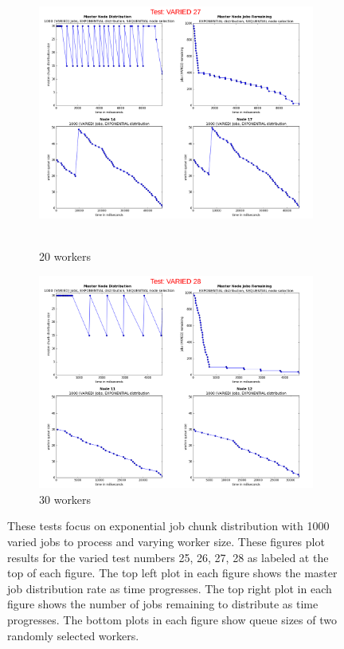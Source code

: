 \documentclass{article}
\begin{document}
\begin{figure}
  
  \begin{subfigure}[b]{0.5\linewidth}
    \centering
    \hbox{\hspace{-5.0em} \includegraphics[width=1.2\linewidth]{combined_varied_growing_workers_exp/case_varied_27} }
    \caption{20 workers} 
    \label{testExpVaried20} 
    \vspace{4ex}
  \end{subfigure}%
  \begin{subfigure}[b]{0.5\linewidth}
    \centering
    \includegraphics[width=1.2\linewidth]{combined_varied_growing_workers_exp/case_varied_28} 
    \caption{30 workers} 
    \label{testExpVaried30} 
    \vspace{4ex}
  \end{subfigure} 
  
  
  \caption{These tests focus on exponential job chunk distribution with 1000 varied jobs to process and varying worker size. These figures plot results for the varied test numbers 25, 26, 27, 28 as labeled at the top of each figure. The top left plot in each figure shows the master job distribution rate as time progresses. The top right plot in each figure shows the number of jobs remaining to distribute as time progresses. The bottom plots in each figure show queue sizes of two randomly selected workers.}
  \label{testsVariedExp} 
  
\end{figure}
\end{document}
